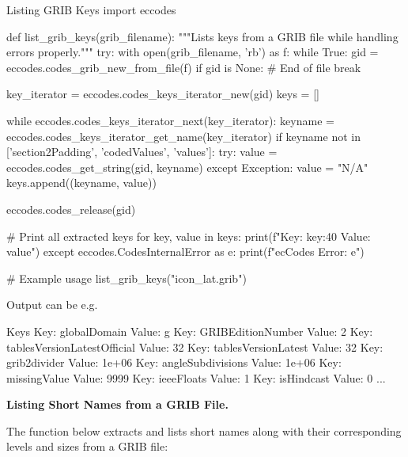 \begin{codeonly}{Listing GRIB Keys}
import eccodes

def list_grib_keys(grib_filename):
    """Lists keys from a GRIB file while handling errors properly."""
    try:
        with open(grib_filename, 'rb') as f:
            while True:
                gid = eccodes.codes_grib_new_from_file(f)
                if gid is None:  # End of file
                    break

                key_iterator = eccodes.codes_keys_iterator_new(gid)
                keys = []

                while eccodes.codes_keys_iterator_next(key_iterator):
                    keyname = eccodes.codes_keys_iterator_get_name(key_iterator)
                    if keyname not in ['section2Padding', 'codedValues', 'values']:
                        try:
                            value = eccodes.codes_get_string(gid, keyname)
                        except Exception:
                            value = "N/A"
                        keys.append((keyname, value))

                eccodes.codes_release(gid)
                
                # Print all extracted keys
                for key, value in keys:
                    print(f"Key: {key:40} Value: {value}")
    except eccodes.CodesInternalError as e:
        print(f"ecCodes Error: {e}")

# Example usage
list_grib_keys("icon_lat.grib")
\end{codeonly}

Output can be e.g.\
\begin{codeonly}{Keys}
Key: globalDomain                             Value: g
Key: GRIBEditionNumber                        Value: 2
Key: tablesVersionLatestOfficial              Value: 32
Key: tablesVersionLatest                      Value: 32
Key: grib2divider                             Value: 1e+06
Key: angleSubdivisions                        Value: 1e+06
Key: missingValue                             Value: 9999
Key: ieeeFloats                               Value: 1
Key: isHindcast                               Value: 0
...
\end{codeonly}


{\bf Listing Short Names from a GRIB File.}

The function below extracts and lists short names along with their corresponding levels and sizes from a GRIB file:

